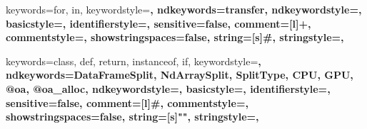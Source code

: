 \usepackage[compact]{titlesec}
\usepackage{booktabs}
\usepackage{enumitem}

\usepackage{subcaption}
\usepackage{float}
\usepackage{cleveref}
\usepackage{amssymb}
\usepackage{tcolorbox}

\makeatletter
\newcommand{\nospaceS}{\S\@gobble}
\makeatother
\Crefname{section}{\nospaceS}{\nospaceS}

\usepackage[scaled=0.85]{beramono}
\usepackage{listings}
\usepackage{hyperref}
\usepackage{xcolor}

\hypersetup{
    colorlinks=true,
    urlcolor=blue,
    breaklinks=true
}

\def\lstfloatautorefname{Listing} %

\newcommand\code[1]{\lstinline$#1$}

 {
 keywords={for, in},
 keywordstyle=\color{BrickRed}\bfseries,
 ndkeywords={transfer},
 ndkeywordstyle=\color{NavyBlue}\bfseries,
 basicstyle=\small\ttfamily,
 identifierstyle=\color{black},
 sensitive=false,
 comment=[l]{+},
 commentstyle=\color{ForestGreen}\ttfamily\bfseries,
 showstringspaces=false,
 string=[s]{\#}{\.},
 stringstyle=\color{gray}\ttfamily,
}

 {
 keywords={class, def, return, instanceof, if},
 keywordstyle=\color{BrickRed}\bfseries,
 ndkeywords={DataFrameSplit, NdArraySplit, SplitType, CPU, GPU, @oa, @oa_alloc},
 ndkeywordstyle=\color{NavyBlue}\bfseries,
 basicstyle=\small\ttfamily,
 identifierstyle=\color{black},
 sensitive=false,
 comment=[l]{\#},
 commentstyle=\color{gray}\ttfamily\bfseries,
 showstringspaces=false,
 string=[s]{"}{"},
 stringstyle=\color{ForestGreen}\ttfamily,
}

\lstset{language=Python}



\newcommand{\keith}[1]{\textcolor{red}{{\sf (KW: #1)}}}
\newcommand{\thea}[1]{\textcolor{red}{{\sf (TR: #1)}}}
\newcommand{\gina}[1]{\textcolor{red}{\sf {(GY: #1)}}}

\date{}


